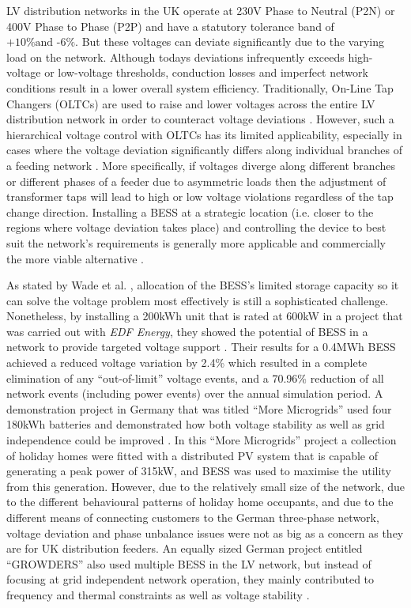 LV distribution networks in the UK operate at 230V Phase to Neutral (P2N) or 400V Phase to Phase (P2P) and have a statutory tolerance band of $\text{+10\% and -6\%}$.
But these voltages can deviate significantly due to the varying load on the network.
Although todays deviations infrequently exceeds high-voltage or low-voltage thresholds, conduction losses and imperfect network conditions result in a lower overall system efficiency.
Traditionally, On-Line Tap Changers (OLTCs) are used to raise and lower voltages across the entire LV distribution network in order to counteract voltage deviations \cite{Sun2009}.
However, such a hierarchical voltage control with OLTCs has its limited applicability, especially in cases where the voltage deviation significantly differs along individual branches of a feeding network \cite{Zangs2016}.
More specifically, if voltages diverge along different branches or different phases of a feeder due to asymmetric loads then the adjustment of transformer taps will lead to high or low voltage violations regardless of the tap change direction.
Installing a BESS at a strategic location (i.e. closer to the regions where voltage deviation takes place) and controlling the device to best suit the network's requirements is generally more applicable and commercially the more viable alternative \cite{Liserre2010}.

As stated by Wade et al. \cite{Wade2009}, allocation of the BESS's limited storage capacity so it can solve the voltage problem most effectively is still a sophisticated challenge.
Nonetheless, by installing a 200kWh unit that is rated at 600kW in a project that was carried out with \textit{EDF Energy}, they showed the potential of BESS in a network to provide targeted voltage support \cite{Wade2010}.
Their results for a 0.4MWh BESS achieved a reduced voltage variation by 2.4\% which resulted in a complete elimination of any ``out-of-limit'' voltage events, and a 70.96\% reduction of all network events (including power events) over the annual simulation period.
A demonstration project in Germany that was titled ``More Microgrids'' used four 180kWh batteries and demonstrated how both voltage stability as well as grid independence could be improved \cite{Overbeeke2010}.
In this ``More Microgrids'' project a collection of holiday homes were fitted with a distributed PV system that is capable of generating a peak power of 315kW, and BESS was used to maximise the utility from this generation.
However, due to the relatively small size of the network, due to the different behavioural patterns of holiday home occupants, and due to the different means of connecting customers to the German three-phase network, voltage deviation and phase unbalance issues were not as big as a concern as they are for UK distribution feeders.
An equally sized German project entitled ``GROWDERS'' also used multiple BESS in the LV network, but instead of focusing at grid independent network operation, they mainly contributed to frequency and thermal constraints as well as voltage stability \cite{GROWDERS2011}.

